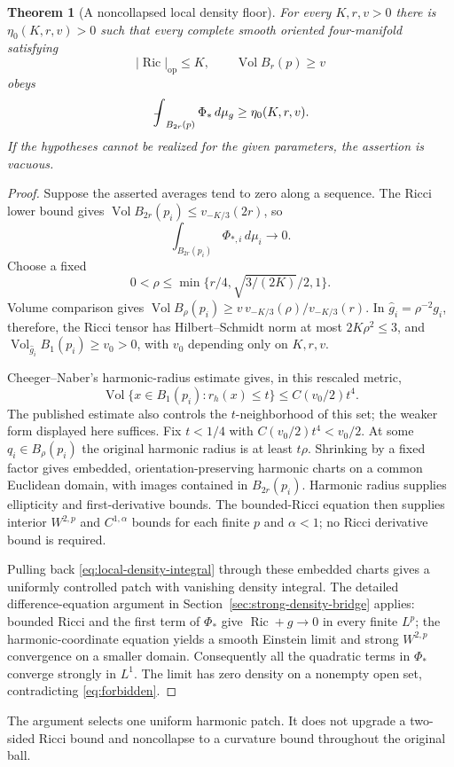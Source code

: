 \documentclass[a4paper,11pt]{article}
\numberwithin{equation}{section}
\newtheorem{theorem}{Theorem}[section]
\theoremstyle{definition}
\newcommand{\Ric}{\operatorname{Ric}}
\newcommand{\Vol}{\operatorname{Vol}}
\newcommand{\op}{\mathrm{op}}
\newcommand{\dd}{\,d\mu_g}
\newcommand{\fint}{\mathop{\rlap{\,\raisebox{0.1ex}{\tiny$-$}}\int}\nolimits}
\begin{document}
\begin{theorem}[A noncollapsed local density floor]\label{thm:local-density}
For every $K,r,v>0$ there is $\eta_0(K,r,v)>0$ such that every complete smooth oriented four-manifold satisfying
\[
|\Ric|_{\op}\le K,\qquad \Vol B_r(p)\ge v
\]
obeys
\begin{equation}\label{eq:local-density-floor}
\fint_{B_{2r}(p)}\Phi_*\dd\ge\eta_0(K,r,v).
\end{equation}
If the hypotheses cannot be realized for the given parameters, the assertion is vacuous.
\end{theorem}
\begin{proof}
Suppose the asserted averages tend to zero along a sequence. The Ricci lower bound gives $\Vol B_{2r}(p_i)\le v_{-K/3}(2r)$, so
\begin{equation}\label{eq:local-density-integral}
\int_{B_{2r}(p_i)}\Phi_{*,i}\,d\mu_i\longrightarrow0.
\end{equation}
Choose a fixed
\[
0<\rho\le\min\{r/4,\sqrt{3/(2K)}/2,1\}.
\]
Volume comparison gives
$\Vol B_\rho(p_i)\ge v\,v_{-K/3}(\rho)/v_{-K/3}(r)$.
In $\hat g_i=\rho^{-2}g_i$, therefore, the Ricci tensor has Hilbert--Schmidt norm at most $2K\rho^2\le3$, and $\Vol_{\hat g_i}B_1(p_i)\ge v_0>0$, with $v_0$ depending only on $K,r,v$.

Cheeger--Naber's harmonic-radius estimate\cite[Theorem 1.13]{CN} gives, in this rescaled metric,
\begin{equation}\label{eq:local-harmonic-radius}
\Vol\{x\in B_1(p_i):r_h(x)\le t\}\le C(v_0/2)t^4.
\end{equation}
The published estimate also controls the $t$-neighborhood of this set; the weaker form displayed here suffices. Fix $t<1/4$ with $C(v_0/2)t^4<v_0/2$. At some $q_i\in B_\rho(p_i)$ the original harmonic radius is at least $t\rho$. Shrinking by a fixed factor gives embedded, orientation-preserving harmonic charts on a common Euclidean domain, with images contained in $B_{2r}(p_i)$. Harmonic radius supplies ellipticity and first-derivative bounds. The bounded-Ricci equation then supplies interior $W^{2,p}$ and $C^{1,\alpha}$ bounds for each finite $p$ and $\alpha<1$; no Ricci derivative bound is required\cite[Definition 2.9 and the ensuing regularity statement]{CN}.

Pulling back \eqref{eq:local-density-integral} through these embedded charts gives a uniformly controlled patch with vanishing density integral. The detailed difference-equation argument in Section~\ref{sec:strong-density-bridge} applies: bounded Ricci and the first term of $\Phi_*$ give $\Ric+g\to0$ in every finite $L^p$; the harmonic-coordinate equation yields a smooth Einstein limit and strong $W^{2,p}$ convergence on a smaller domain. Consequently all the quadratic terms in $\Phi_*$ converge strongly in $L^1$. The limit has zero density on a nonempty open set, contradicting \eqref{eq:forbidden}.
\end{proof}
The argument selects one uniform harmonic patch. It does not upgrade a two-sided Ricci bound and noncollapse to a curvature bound throughout the original ball.
\end{document}
